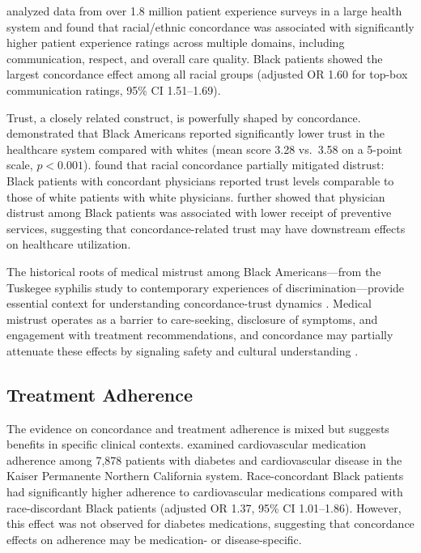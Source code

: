 \documentclass[12pt]{article}
\begin{document}
\citet{takeshita2020} analyzed data from over 1.8 million patient experience surveys in a large health system and found that racial/ethnic concordance was associated with significantly higher patient experience ratings across multiple domains, including communication, respect, and overall care quality. Black patients showed the largest concordance effect among all racial groups (adjusted OR 1.60 for top-box communication ratings, 95\% CI 1.51--1.69).

Trust, a closely related construct, is powerfully shaped by concordance. \citet{boulware2003} demonstrated that Black Americans reported significantly lower trust in the healthcare system compared with whites (mean score 3.28 vs.\ 3.58 on a 5-point scale, $p < 0.001$). \citet{doescher2000} found that racial concordance partially mitigated distrust: Black patients with concordant physicians reported trust levels comparable to those of white patients with white physicians. \citet{armstrong2013} further showed that physician distrust among Black patients was associated with lower receipt of preventive services, suggesting that concordance-related trust may have downstream effects on healthcare utilization.

The historical roots of medical mistrust among Black Americans---from the Tuskegee syphilis study to contemporary experiences of discrimination---provide essential context for understanding concordance-trust dynamics \citep{gamble1997, williamson2019}. Medical mistrust operates as a barrier to care-seeking, disclosure of symptoms, and engagement with treatment recommendations, and concordance may partially attenuate these effects by signaling safety and cultural understanding \citep{boulware2003, musa2009}.

\subsection{Treatment Adherence}

The evidence on concordance and treatment adherence is mixed but suggests benefits in specific clinical contexts. \citet{traylor2010} examined cardiovascular medication adherence among 7,878 patients with diabetes and cardiovascular disease in the Kaiser Permanente Northern California system. Race-concordant Black patients had significantly higher adherence to cardiovascular medications compared with race-discordant Black patients (adjusted OR 1.37, 95\% CI 1.01--1.86). However, this effect was not observed for diabetes medications, suggesting that concordance effects on adherence may be medication- or disease-specific.
\end{document}
